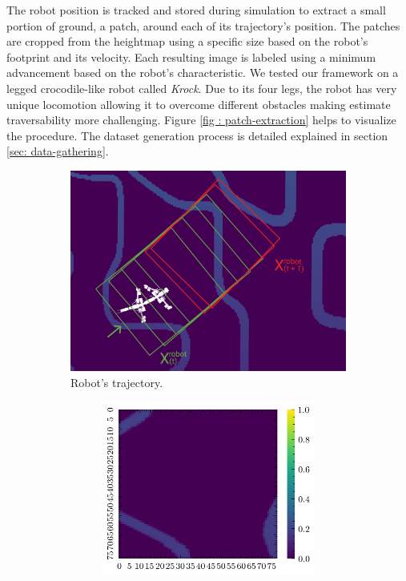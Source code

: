 \documentclass[../document.tex]{subfiles}
\begin{document}
The robot position is tracked and stored during simulation to extract a small portion of ground, a patch, around each of its trajectory's position. The patches are cropped from the heightmap using a specific size based on the robot's footprint and its velocity. Each resulting image is labeled using a minimum advancement based on the robot's characteristic. We tested our framework on a legged crocodile-like robot called \emph{Krock}. Due to its four legs, the robot has very unique locomotion allowing it to overcome different obstacles making estimate traversability more challenging. Figure \ref{fig : patch-extraction} helps to visualize the procedure. The dataset generation process is detailed explained in section \ref{sec: data-gathering}.  
\begin{figure} [htbp]
    \centering
    \begin{subfigure}[b]{0.66\textwidth}
    \includegraphics[width=\textwidth]{../img/krock-bars-correct-small.png}
    \caption{Robot's trajectory.}
\end{subfigure}
\begin{subfigure}[b]{1\textwidth}
    \begin{subfigure}[b]{0.24\textwidth}
    \includegraphics[width=\linewidth]{../img/bars1-example-patches/2d/2.png}    

\end{subfigure}
\end{subfigure}
\end{figure}
\end{document}

